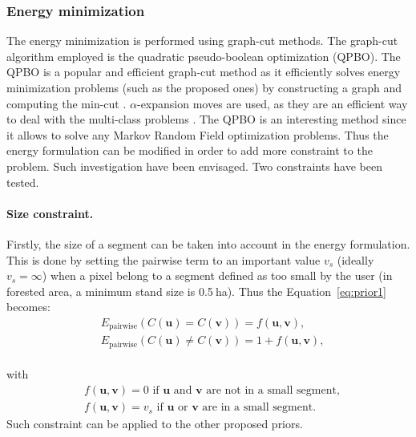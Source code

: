 \subsubsection{Energy minimization}
The energy minimization is performed using graph-cut methods. The graph-cut algorithm employed is the quadratic pseudo-boolean optimization (QPBO). The QPBO is a popular and efficient graph-cut method as it efficiently solves energy minimization problems (such as the proposed ones) by constructing a graph and computing the min-cut \cite{kolmogorov2007minimizing}. $\alpha$-expansion moves are used, as they are an efficient way to deal with the multi-class problems \cite{kolmogorov2004energy}. The QPBO is an interesting method since it allows to solve any Markov Random Field optimization problems. Thus the energy formulation can be modified in order to add more constraint to the problem. Such investigation have been envisaged. Two constraints have been tested. \\

\paragraph{Size constraint. \\}
Firstly, the size of a segment can be taken into account in the energy formulation. This is done by setting the pairwise term to an important value $v_{s}$ (ideally $v_{s}=\infty$) when a pixel belong to a segment defined as too small by the user (in forested area, a minimum stand size is 0.5$\:$ha). Thus the Equation~\ref{eq:prior1} becomes:
\begin{equation}
\begin{aligned}
& E_{\text{pairwise}}(C(\mathbf{u}) = C(\mathbf{v}))=f(\mathbf{u},\mathbf{v}), \\
& E_{\text{pairwise}}(C(\mathbf{u}) \neq C(\mathbf{v}))=1 + f(\mathbf{u},\mathbf{v}),
\end{aligned}
\label{eq:prior1b}
\end{equation}\\
with
\begin{equation}
\begin{aligned}
& f(\mathbf{u},\mathbf{v})=0 \text{ if $\mathbf{u}$ and $\mathbf{v}$ are not in a small segment}, \\
& f(\mathbf{u},\mathbf{v})=v_{s} \text{ if $\mathbf{u}$ or $\mathbf{v}$ are in a small segment}.
\end{aligned}
\label{eq:prior1bf}
\end{equation}
Such constraint can be applied to the other proposed priors.

